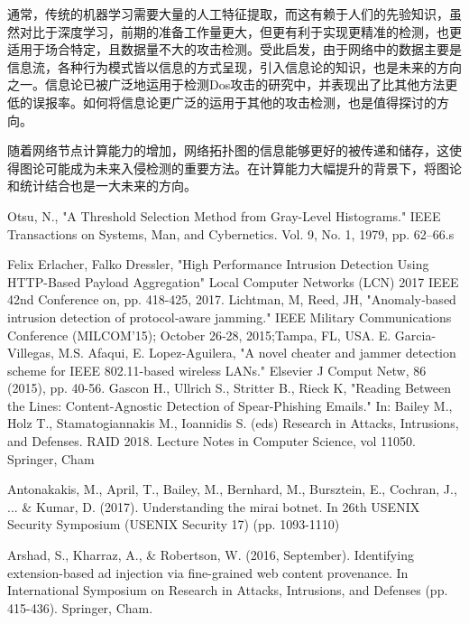 \documentclass[12pt]{article} %
\begin{document}
通常，传统的机器学习需要大量的人工特征提取，而这有赖于人们的先验知识，虽然对比于深度学习，前期的准备工作量更大，但更有利于实现更精准的检测，也更适用于场合特定，且数据量不大的攻击检测。受此启发，由于网络中的数据主要是信息流，各种行为模式皆以信息的方式呈现，引入信息论的知识，也是未来的方向之一。信息论已被广泛地运用于检测Dos攻击的研究中，并表现出了比其他方法更低的误报率。如何将信息论更广泛的运用于其他的攻击检测，也是值得探讨的方向。

随着网络节点计算能力的增加，网络拓扑图的信息能够更好的被传递和储存，这使得图论可能成为未来入侵检测的重要方法。在计算能力大幅提升的背景下，将图论和统计结合也是一大未来的方向。

\begin{thebibliography}{99}

 Otsu, N., "A Threshold Selection Method from Gray-Level Histograms." IEEE Transactions on Systems, Man, and Cybernetics. Vol. 9, No. 1, 1979, pp. 62–66.s

 Felix Erlacher, Falko Dressler, "High Performance Intrusion Detection Using HTTP-Based Payload Aggregation" Local Computer Networks (LCN) 2017 IEEE 42nd Conference on, pp. 418-425, 2017.
 Lichtman, M, Reed, JH, "Anomaly‐based intrusion detection of protocol‐aware jamming." IEEE Military Communications Conference (MILCOM'15); October 26‐28, 2015;Tampa, FL, USA.
 E. Garcia-Villegas, M.S. Afaqui, E. Lopez-Aguilera, "A novel cheater and jammer detection scheme for IEEE 802.11-based wireless LANs." Elsevier J Comput Netw, 86 (2015), pp. 40-56.
 Gascon H., Ullrich S., Stritter B., Rieck K, "Reading Between the Lines: Content-Agnostic Detection of Spear-Phishing Emails." In: Bailey M., Holz T., Stamatogiannakis M., Ioannidis S. (eds) Research in Attacks, Intrusions, and Defenses. RAID 2018. Lecture Notes in Computer Science, vol 11050. Springer, Cham

 Antonakakis, M., April, T., Bailey, M., Bernhard, M., Bursztein, E., Cochran, J., ... & Kumar, D. (2017). Understanding the mirai botnet. In 26th {USENIX} Security Symposium ({USENIX} Security 17) (pp. 1093-1110)

 Arshad, S., Kharraz, A., & Robertson, W. (2016, September). Identifying extension-based ad injection via fine-grained web content provenance. In International Symposium on Research in Attacks, Intrusions, and Defenses (pp. 415-436). Springer, Cham.

\end{thebibliography}
\end{document}
